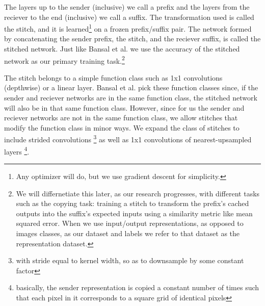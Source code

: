 \documentclass{article} %
\begin{document}
The layers up to the sender (inclusive) we call a prefix and the layers from the reciever to the end (inclusive) we call
a suffix. The transformation used is called the stitch, and it is learned\footnote{Any optimizer will do, but we use gradient descent for simplicity.}
on a frozen prefix/suffix pair. The network formed by concatenating the sender prefix, the stitch, and the reciever
suffix, is called the stitched network. Just like Bansal et al. we use the accuracy of the stitched network as our
primary training task.\footnote{We will differnetiate this later, as our research progresses,
with different tasks such as the copying task: training a stitch
to transform the prefix's cached outputs into the suffix's expected inputs using a similarity metric like mean squared
error. When we use input/output representations, as opposed to images classes, as our dataset and labels we refer to 
that dataset as the representation dataset.}

The stitch belongs to a simple function class such as 1x1 convolutions (depthwise) or
a linear layer. Bansal et al. pick these function classes since, if the sender and reciever networks are in the same
function class, the stitched network will also be in that same function class. However, since for us the sender and
reciever networks are not in the same function class, we allow stitches that modify the function class in minor ways.
We expand the class of stitches to include strided convolutions \footnote{with stride equal to kernel width, so as to downsample
by some constant factor} as well as 1x1 convolutions of nearest-upsampled layers \footnote{basically, the sender representation
is copied a constant number of times such that each pixel in it corresponds to a square grid of identical pixels}.
\end{document}
